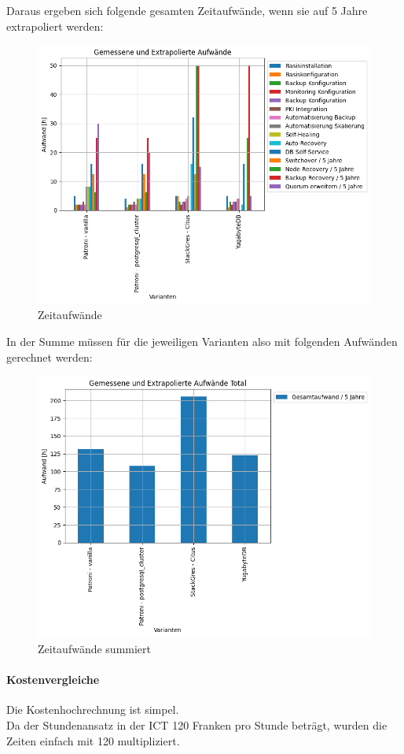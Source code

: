 \begin{flushleft}
    Daraus ergeben sich folgende gesamten Zeitaufwände, wenn sie auf 5 Jahre extrapoliert werden:
    \begin{figure}[H]
        \centering
        \includegraphics[width=1\linewidth]{source/pandas_data_chart_plotter/time_investment}
        \caption{Zeitaufwände}
        \label{fig:time_investment}
    \end{figure}
\end{flushleft}
\begin{flushleft}
    In der Summe müssen für die jeweiligen Varianten also mit folgenden Aufwänden gerechnet werden:
    \begin{figure}[H]
        \centering
        \includegraphics[width=0.75\linewidth]{source/pandas_data_chart_plotter/time_investment_summe}
        \caption{Zeitaufwände summiert}
        \label{fig:time_investment_summe}
    \end{figure}
    \paragraph{Kostenvergleiche}
    Die Kostenhochrechnung ist simpel.\\
    Da der Stundenansatz in der ICT 120 Franken pro Stunde beträgt, wurden die Zeiten einfach mit 120 multipliziert.
\end{flushleft}
